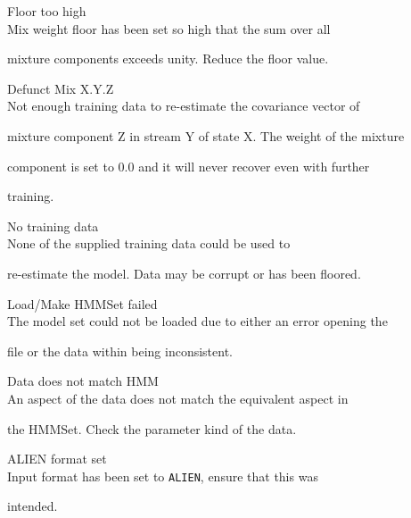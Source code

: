 \begin{itemize}
\begin{itemize}
    Floor too high\\


        Mix weight floor has been set so high that the sum over all 


        mixture components exceeds unity.  Reduce the floor value.





    Defunct Mix X.Y.Z \\


        Not enough training data to re-estimate the covariance vector of


        mixture component Z in stream Y of state X. The weight of the mixture


        component is set to 0.0 and it will never recover even with further


        training.





    No training data\\


        None of the supplied training data could be used to


        re-estimate the model. Data may be corrupt or has been floored.





    Load/Make HMMSet failed\\


        The model set could not be loaded due to either an error opening the


        file or the data within being inconsistent.





    Data does not match HMM\\


        An aspect of the data does not match the equivalent aspect in 


        the HMMSet.  Check the parameter kind of the data.





    ALIEN format set\\


        Input format has been set to \texttt{ALIEN}, ensure that this was 


        intended.






\end{itemize}
\end{itemize}
